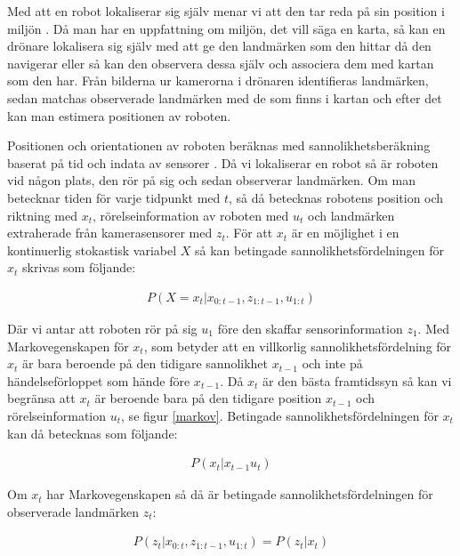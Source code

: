 Med att en robot lokaliserar sig själv menar vi att den tar reda på sin position i miljön \citep{982903}. Då man har en uppfattning om miljön, det vill säga en karta, så kan en drönare lokalisera sig själv med att ge den landmärken som den hittar då den navigerar eller så kan den observera dessa själv och associera dem med kartan som den har. Från bilderna ur kamerorna i drönaren identifieras landmärken, sedan matchas observerade landmärken med de som finns i kartan och efter det kan man estimera positionen av roboten.

Positionen och orientationen av roboten beräknas med sannolikhetsberäkning baserat på tid och indata av sensorer \citep{ProbabilisticRobotics}. Då vi lokaliserar en robot så är roboten vid någon plats, den rör på sig och sedan observerar landmärken. Om man betecknar tiden för varje tidpunkt med $t$, så då betecknas robotens position och riktning med $x_t$, rörelseinformation av roboten med $u_t$ och landmärken extraherade från kamerasensorer med $z_t$. För att $x_t$ är en möjlighet i en kontinuerlig stokastisk variabel $X$ så kan betingade sannolikhetsfördelningen för $x_t$ skrivas som följande:

\begin{align}
    P( X = x_t | x_{0:t-1}, z_{1:t-1}, u_{1:t})
\end{align}

Där vi antar att roboten rör på sig $u_1$ före den skaffar sensorinformation $z_1$. Med Markovegenskapen för $x_t$, som betyder att en villkorlig sannolikhetsfördelning för $x_t$ är bara beroende på den tidigare sannolikhet $x_{t-1}$ och inte på händelseförloppet som hände före $x_{t-1}$. Då $x_t$ är den bästa framtidssyn så kan vi begränsa att $x_t$ är beroende bara på den tidigare position $x_{t-1}$ och rörelseinformation $u_t$, se figur \ref{markov}. Betingade sannolikhetsfördelningen för $x_t$ kan då betecknas som följande:

\begin{align}
    P(x_t | x_{t-1} u_{t})
\end{align}

Om $x_t$ har Markovegenskapen så då är betingade sannolikhetsfördelningen för observerade landmärken $z_t$:

\begin{align}
    P(z_t | x_{0:t}, z_{1:t-1}, u_{1:t}) = P(z_t|x_t)
\end{align}

